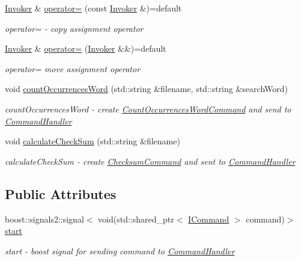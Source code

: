 \begin{DoxyCompactItemize}
\hyperlink{classtwo__gis__test_1_1command__handler_1_1_invoker}{Invoker} \& \hyperlink{classtwo__gis__test_1_1command__handler_1_1_invoker_ab0f46886672dd682e4c3da7de24afb16}{operator=} (const \hyperlink{classtwo__gis__test_1_1command__handler_1_1_invoker}{Invoker} \&)=default
\begin{DoxyCompactList}\small\item\em operator= -\/ copy assignment operator \end{DoxyCompactList}\item 
\hyperlink{classtwo__gis__test_1_1command__handler_1_1_invoker}{Invoker} \& \hyperlink{classtwo__gis__test_1_1command__handler_1_1_invoker_a0e5ad5a769bf4ad41793ef577fbd36f7}{operator=} (\hyperlink{classtwo__gis__test_1_1command__handler_1_1_invoker}{Invoker} \&\&)=default
\begin{DoxyCompactList}\small\item\em operator= move assignment operator \end{DoxyCompactList}\item 
void \hyperlink{classtwo__gis__test_1_1command__handler_1_1_invoker_aa883eef9d0cdc7d9d2b299a656fc0dc0}{count\+Occurrences\+Word} (std\+::string \&filename, std\+::string \&search\+Word)
\begin{DoxyCompactList}\small\item\em count\+Occurrences\+Word -\/ create \hyperlink{classtwo__gis__test_1_1command__handler_1_1_count_occurrences_word_command}{Count\+Occurrences\+Word\+Command} and send to \hyperlink{classtwo__gis__test_1_1command__handler_1_1_command_handler}{Command\+Handler} \end{DoxyCompactList}\item 
void \hyperlink{classtwo__gis__test_1_1command__handler_1_1_invoker_ae8fcf1764c98033f7fe855f4924eab7f}{calculate\+Check\+Sum} (std\+::string \&filename)
\begin{DoxyCompactList}\small\item\em calculate\+Check\+Sum -\/ create \hyperlink{classtwo__gis__test_1_1command__handler_1_1_checksum_command}{Checksum\+Command} and sent to \hyperlink{classtwo__gis__test_1_1command__handler_1_1_command_handler}{Command\+Handler} \end{DoxyCompactList}\end{DoxyCompactItemize}
\subsection*{Public Attributes}
\begin{DoxyCompactItemize}
\item 
boost\+::signals2\+::signal$<$ void(std\+::shared\+\_\+ptr$<$ \hyperlink{classtwo__gis__test_1_1command__handler_1_1_i_command}{I\+Command} $>$ command)$>$ \hyperlink{classtwo__gis__test_1_1command__handler_1_1_invoker_a93519fc81bdc3f6e1832c6e3c1b5ad3a}{start}
\begin{DoxyCompactList}\small\item\em start -\/ boost signal for sending command to \hyperlink{classtwo__gis__test_1_1command__handler_1_1_command_handler}{Command\+Handler} \end{DoxyCompactList}\end{DoxyCompactItemize}
